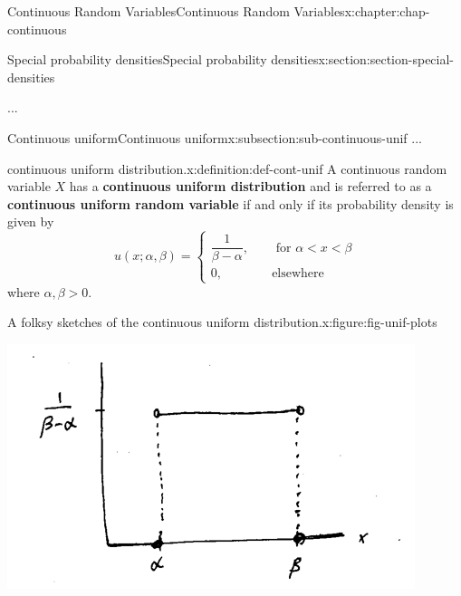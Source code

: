 \documentclass[oneside,10pt,]{book}
\newcommand{\terminology}[1]{\textbf{#1}}
\newcommand{\lt}{<}
\newcommand{\gt}{>}
\newcommand{\amp}{&}
\begin{document}
\begin{chapterptx}{Continuous Random Variables}{}{Continuous Random Variables}{}{}{x:chapter:chap-continuous}
\typeout{************************************************}
%
\begin{sectionptx}{Special probability densities}{}{Special probability densities}{}{}{x:section:section-special-densities}
\begin{introduction}{}%
...%
\end{introduction}%
%
%
\typeout{************************************************}
\typeout{************************************************}
%
\begin{subsectionptx}{Continuous uniform}{}{Continuous uniform}{}{}{x:subsection:sub-continuous-unif}
...%
\begin{definition}{continuous uniform distribution.}{x:definition:def-cont-unif}%
A continuous random variable \(\displaystyle X\) has a \terminology{continuous uniform distribution} and is referred to as a \terminology{continuous uniform random variable} if and only if its probability density is given by%
\begin{equation*}
u(x; \alpha, \beta) =
\begin{cases}\dfrac{1}{\beta - \alpha}, \amp \quad \text{ for }\alpha
\lt x \lt \beta\\0, \amp \quad \text{elsewhere}\end{cases}
\end{equation*}
where \(\alpha, \beta \gt 0\).%
\end{definition}
\begin{figureptx}{A folksy sketches of the continuous uniform distribution.}{x:figure:fig-unif-plots}{}%
\begin{image}{0.25}{0.5}{0.25}%
\includegraphics[width=\linewidth]{./images/unif.png}
\end{image}%

\end{figureptx}
\end{subsectionptx}
\end{sectionptx}
\end{chapterptx}
\end{document}

